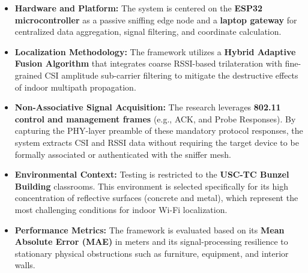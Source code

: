 \begin{itemize}
    \item \textbf{Hardware and Platform:} The system is centered on the \textbf{ESP32 microcontroller} as a passive sniffing edge node and a \textbf{laptop gateway} for centralized data aggregation, signal filtering, and coordinate calculation.\smallskip
    \item \textbf{Localization Methodology:} The framework utilizes a \textbf{Hybrid Adaptive Fusion Algorithm} that integrates coarse RSSI-based trilateration with fine-grained CSI amplitude sub-carrier filtering to mitigate the destructive effects of indoor multipath propagation.\smallskip
    \item \textbf{Non-Associative Signal Acquisition:} The research leverages \textbf{802.11 control and management frames} (e.g., ACK, and Probe Responses). By capturing the PHY-layer preamble of these mandatory protocol responses, the system extracts CSI and RSSI data without requiring the target device to be formally associated or authenticated with the sniffer mesh.\smallskip
    \item \textbf{Environmental Context:} Testing is restricted to the \textbf{USC-TC Bunzel Building} classrooms. This environment is selected specifically for its high concentration of reflective surfaces (concrete and metal), which represent the most challenging conditions for indoor Wi-Fi localization.\smallskip
    \item \textbf{Performance Metrics:} The framework is evaluated based on its \textbf{Mean Absolute Error (MAE)} in meters and its signal-processing resilience to stationary physical obstructions such as furniture, equipment, and interior walls.\smallskip
\end{itemize}


